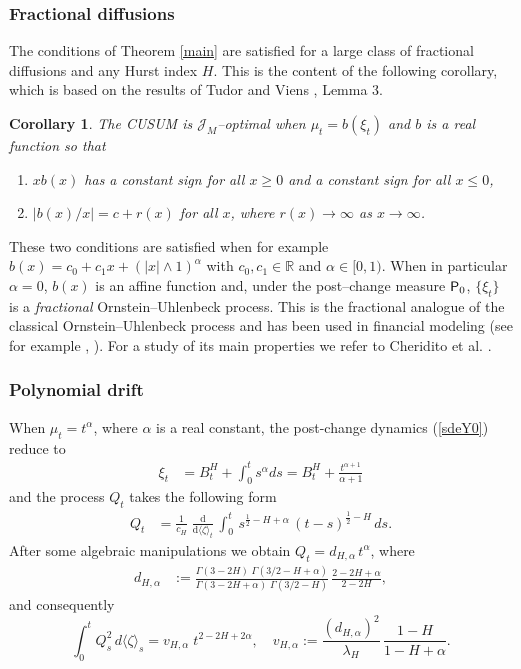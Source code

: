 \documentclass[11pt,reqno]{amsart}
\newtheorem{corollary}[theorem]{Corollary}
\theoremstyle{remark}
\begin{document}
\subsubsection{Fractional diffusions}
The conditions of Theorem \ref{main} are satisfied for a large class of fractional diffusions and any Hurst index $H$. This is the content of the following corollary, which is based on the results of Tudor and Viens \cite{TV}, Lemma 3. 

\begin{corollary}
The CUSUM is ${\mathcal{J}}_{M}$--optimal when $\mu_{t}= b(\xi_{t})$ and $b$ is a real function so that
\begin{enumerate}
\item[(i)] $x b(x)$ has a constant sign for all $x \geq 0$ and a constant sign for all $x \leq 0$,
\item[(ii)] $|b(x)/x|= c+ r(x)$ for all $x$, where $r(x) \rightarrow \infty$ as $x\rightarrow  \infty$. 
\end{enumerate}
\end{corollary}
These two conditions are satisfied when for example  $b(x)= c_{0} + c_{1}x + (|x| \wedge 1)^{\alpha}$ with  $c_{0}, c_{1} \in \mathbb{R}$ and $\alpha \in [0,1)$.
When in particular $\alpha=0$, $b(x)$ is an affine function and, under the post--change measure ${{\sf P}}_{0}$,  $\{\xi_{t}\}$ is a \textit{fractional} Ornstein--Uhlenbeck  process. This is the fractional analogue of the classical Ornstein--Uhlenbeck process and has been used in financial modeling (see for example \cite{CV}, \cite{CR}). For a study of its main properties we refer to  Cheridito et al. \cite{che}.  

\subsubsection{Polynomial drift}
When $\mu_{t}=t^{\alpha}$, where $\alpha$ is a real constant,  the post-change dynamics (\ref{sdeY0}) reduce to 
\begin{align*} 
\xi_{t} &=  B^{H}_{t} + \int_{0}^{t} s^{\alpha} ds = B^{H}_{t} + \frac{t^{\alpha+1}}{\alpha+1}
\end{align*}
and the process $Q_{t}$ takes the following form
\begin{align*} 
Q_{t} 
& = \frac{1}{c_{H}} \; \frac{\text{d}}{\text{d} \langle \zeta \rangle_{t}} \, \int_{0}^{t} \, s^{\frac{1}{2}-H+\alpha} \,  (t-s)^{\frac{1}{2}-H} \, ds. 
\end{align*}
After some algebraic manipulations 
we  obtain  $Q_{t}= d_{H,\alpha} \, t^{\alpha}$, where
\begin{align*}  
d_{H,\alpha} &:= \frac{\Gamma(3-2H) \; \Gamma(3/2-H+ \alpha)}{\Gamma(3-2H+\alpha) \; \Gamma(3/2-H)} \, \frac{2-2 H+\alpha}{2-2H},
\end{align*}
and consequently
\begin{equation} \label{qfbm}
\int_{0}^{t} Q_{s}^{2} \, d\langle \zeta \rangle_{s} =  v_{H,\alpha} \; t^{2-2H+2\alpha}, \quad v_{H,\alpha}:=  \frac{(d_{H,\alpha})^{2}}{\lambda_{H}}  \, \frac{1-H}{1-H+\alpha}.
\end{equation}
\end{document}
